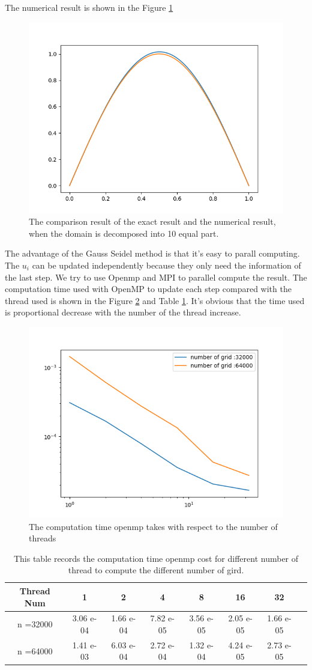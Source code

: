 \documentclass[11pt]{article}
\begin{document}
The numerical result is shown in the Figure \ref{fig:result comparison}
\begin{figure}
    \centering
    \includegraphics[width = 0.5\linewidth]{../CPP_code/1D_problem/openmp_version_gauss_seidel/result.png}
    \caption{The comparison result of the exact result and the numerical result, when the domain is decomposed into 10 equal part.}
    \label{fig:result comparison}
\end{figure}


The advantage of the Gauss Seidel method is that it's easy to parall computing. The $u_i$ can be updated independently because they only need the information of the last step. We try to use Openmp and MPI to parallel compute the result.  The computation time used with OpenMP to update each step compared with the thread used is shown in the Figure \ref{fig:openmp result} and Table \ref{tab:openmp table}. It's obvious that the time used is proportional decrease with the number of the thread increase.
\begin{figure}
    \centering
    \includegraphics[width = 0.5\linewidth]{../CPP_code/1D_problem/openmp_version_gauss_seidel/open_mp_result.png}
    \caption{The computation time openmp takes with respect to the number of threads}
    \label{fig:openmp result}
\end{figure}

\begin{table}[htp]
    \centering
    \begin{tabular}{|c|c|c|c|c|c|c|c|}
    \hline
    Thread Num & 1 & 2 & 4 & 8 & 16 & 32 \\
    \hline
    n =32000     &3.06 e-04&1.66 e-04&7.82 e-05&3.56 e-05&2.05 e-05&1.66 e-05  \\
    \hline
    n =64000     &1.41 e-03&6.03 e-04&2.72 e-04&1.32 e-04&4.24 e-05&2.73 e-05\\
    \hline
    \end{tabular}
    \caption{This table records the computation time openmp cost for different number of thread to compute the different number of gird.}
    \label{tab:openmp table}
\end{table}
\end{document}
